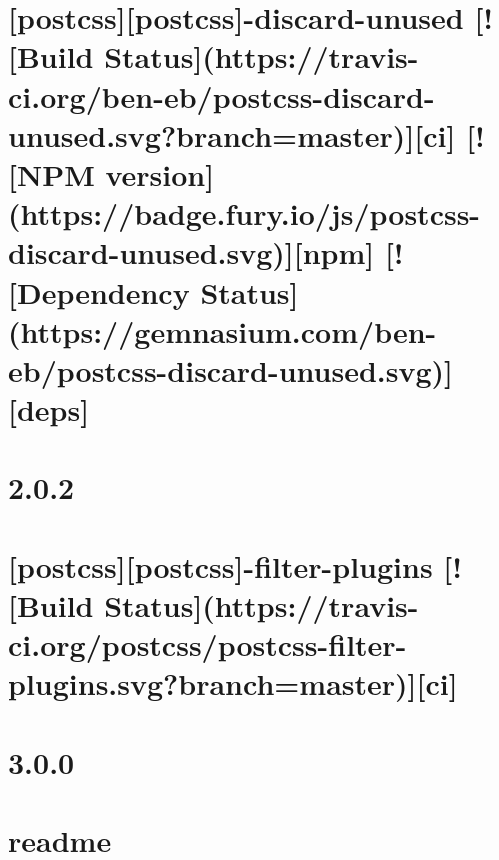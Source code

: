 \documentclass[twoside]{book}
\newcommand{\+}{\discretionary{\mbox{\scriptsize$\hookleftarrow$}}{}{}}
\begin{document}
\chapter{\mbox{[}postcss\mbox{]}\mbox{[}postcss\mbox{]}-\/discard-\/unused \mbox{[}!\mbox{[}Build Status\mbox{]}(https\+://travis-\/ci.org/ben-\/eb/postcss-\/discard-\/unused.svg?branch=master)\mbox{]}\mbox{[}ci\mbox{]} \mbox{[}!\mbox{[}N\+PM version\mbox{]}(https\+://badge.fury.\+io/js/postcss-\/discard-\/unused.svg)\mbox{]}\mbox{[}npm\mbox{]} \mbox{[}!\mbox{[}Dependency Status\mbox{]}(https\+://gemnasium.com/ben-\/eb/postcss-\/discard-\/unused.svg)\mbox{]}\mbox{[}deps\mbox{]}}
\label{md__c_1_workspace_demo_src_main_script_node_modules_postcss-discard-unused__r_e_a_d_m_e}

\chapter{2.0.2}
\label{md__c_1_workspace_demo_src_main_script_node_modules_postcss-filter-plugins__c_h_a_n_g_e_l_o_g}

\chapter{\mbox{[}postcss\mbox{]}\mbox{[}postcss\mbox{]}-\/filter-\/plugins \mbox{[}!\mbox{[}Build Status\mbox{]}(https\+://travis-\/ci.org/postcss/postcss-\/filter-\/plugins.svg?branch=master)\mbox{]}\mbox{[}ci\mbox{]}}
\label{md__c_1_workspace_demo_src_main_script_node_modules_postcss-filter-plugins__r_e_a_d_m_e}

\chapter{3.0.0}
\label{md__c_1_workspace_demo_src_main_script_node_modules_postcss-flexbugs-fixes__c_h_a_n_g_e_l_o_g}

\chapter{readme}
\label{md__c_1_workspace_demo_src_main_script_node_modules_postcss-flexbugs-fixes_node_modules_chalk_readme}

\end{document}
